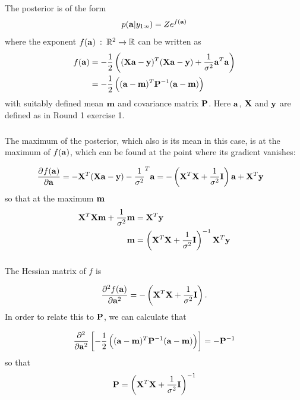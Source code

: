 \documentclass[a4paper,oneside,article]{memoir}
\begin{document}
\subsection{}
\subsubsection{}
The posterior is of the form
\[
p(\mathbf{a}|y_{1:n})=Ze^{f(\mathbf{a})}
\]
where the exponent $f(\mathbf{a})\::\:\mathbb{R}^2\to\mathbb{R}$ can be written as
\begin{align}
	f(\mathbf{a}) &= -\frac{1}{2}\left((\mathbf{Xa}-\mathbf{y})^T(\mathbf{Xa}-\mathbf{y})+\frac{1}{\sigma^2}\mathbf{a}^T\mathbf{a}\right)\\
	&= -\frac{1}{2}\left((\mathbf{a}-\mathbf{m})^T\mathbf{P}^{-1}(\mathbf{a}-\mathbf{m})\right)
\end{align}
with suitably defined mean $\mathbf{m}$ and covariance matrix $\mathbf{P}$. Here $\mathbf{a}$, $\mathbf{X}$ and $\mathbf{y}$ are defined
as in Round 1 exercise 1.


\subsubsection{}
The maximum of the posterior, which also is its mean in this case, is at the maximum of $f(\mathbf{a})$, which can be found 
at the point where its gradient vanishes:

\begin{align}
	\dpd{f(\v{a})}{\v{a}} &= -\v{X}^T(\v{Xa}-\v{y})-\frac{1}{\sigma^2}^T\v{a} = -\left(\v{X}^T\v{X}+\frac{1}{\sigma^2}\v{I}\right)\v{a} + \v{X}^T\v{y}
\end{align}
so that at the maximum $\mathbf{m}$
\begin{align}
	\mathbf{X}^T\mathbf{X}\mathbf{m}+\frac{1}{\sigma^2}\mathbf{m} &= \mathbf{X}^T\mathbf{y} \\
	\mathbf{m} &= \left(\mathbf{X}^T\mathbf{X}+\frac{1}{\sigma^2}\mathbf{I}\right)^{-1}\mathbf{X}^T\mathbf{y} \\
\end{align}

\subsubsection{}

The Hessian matrix of $f$ is

\begin{align}
	\dpd[2]{f(\v{a})}{\v{a}} = -\left(\v{X}^T\v{X}+\frac{1}{\sigma^2}\v{I}\right).
\end{align}
In order to relate this to $\mathbf{P}$, we can calculate that

\begin{align}
	\dpd[2]{}{\v{a}}\left[-\frac{1}{2}\left((\v{a}-\v{m})^T\v{P}^{-1}(\v{a}-\v{m})\right)\right] = -\v{P}^{-1} \label{eq:gauss_hessian}
\end{align}
so that 
\[
	\mathbf{P} = \left(\mathbf{X}^T\mathbf{X}+\frac{1}{\sigma^2}\mathbf{I}\right)^{-1}
\]
\end{document}
